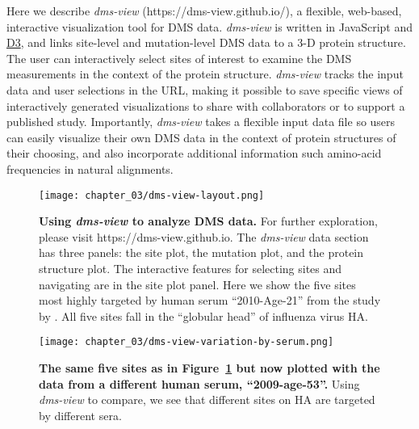 Here we describe \emph{dms-view} (https://dms-view.github.io/), a flexible, web-based, interactive visualization tool for DMS data.
\emph{dms-view} is written in JavaScript and \href{https://d3js.org}{D3}, and links site-level and mutation-level DMS data to a 3-D protein structure.
The user can interactively select sites of interest to examine the DMS measurements in the context of the protein structure.
\emph{dms-view} tracks the input data and user selections in the URL, making it possible to save specific views of interactively generated visualizations to share with collaborators or to support a published study.
Importantly, \emph{dms-view} takes a flexible input data file so users can easily visualize their own DMS data in the context of protein structures of their choosing, and also incorporate additional information such amino-acid frequencies in natural alignments.

\begin{figure}
  \centering
  \texttt{[image: chapter\_03/dms-view-layout.png]}
  \caption[{Using \emph{dms-view} to analyze DMS data.}]{\label{fig:dms-view-layout}{\bf Using \emph{dms-view} to analyze DMS data.}
    For further exploration, please visit https://dms-view.github.io.
    The \emph{dms-view} data section has three panels: the site plot, the mutation plot, and the protein structure plot.
    The interactive features for selecting sites and navigating are in the site plot panel.
    Here we show the five sites most highly targeted by human serum ``2010-Age-21'' from the study by \citet{Lee2019}.
    All five sites fall in the ``globular head'' of influenza virus HA.}
\end{figure}

\begin{figure}
  \centering
  \texttt{[image: chapter\_03/dms-view-variation-by-serum.png]}
  \caption[{The same five sites as in Figure~\ref{fig:dms-view-layout} but now plotted with the data from a different human serum, ``2009-age-53''.}]{\label{fig:dms-view-variation-by-serum} {\bf The same five sites as in Figure~\ref{fig:dms-view-layout} but now plotted with the data from a different human serum, ``2009-age-53''.}
    Using \emph{dms-view} to compare, we see that different sites on HA are targeted by different sera.}
\end{figure}

